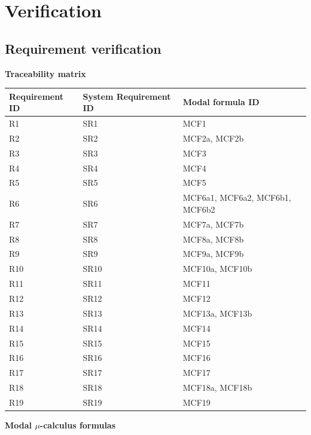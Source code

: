 \documentclass[12pt]{report}
\begin{document}
	\chapter{Verification}

    \section{Requirement verification}

    \textbf{Traceability matrix}\\
    \begin{tabular}{| l | l | l | }
        \hline
        Requirement ID & System Requirement ID & Modal formula ID \\ \hline
        R1 & SR1 & MCF1 \\ \hline
        R2 & SR2 & MCF2a, MCF2b \\ \hline
        R3 & SR3 & MCF3 \\ \hline
        R4 & SR4 & MCF4 \\ \hline
        R5 & SR5 & MCF5 \\ \hline
        R6 & SR6 & MCF6a1, MCF6a2, MCF6b1, MCF6b2 \\ \hline
        R7 & SR7 & MCF7a, MCF7b \\ \hline
        R8 & SR8 & MCF8a, MCF8b \\ \hline
        R9 & SR9 & MCF9a, MCF9b \\ \hline
        R10 & SR10 & MCF10a, MCF10b \\ \hline
        R11 & SR11 & MCF11 \\ \hline
        R12 & SR12 & MCF12 \\ \hline
        R13 & SR13 & MCF13a, MCF13b \\ \hline
        R14 & SR14 & MCF14 \\ \hline
        R15 & SR15 & MCF15 \\ \hline
        R16 & SR16 & MCF16 \\ \hline
        R17 & SR17 & MCF17 \\ \hline
        R18 & SR18 & MCF18a, MCF18b \\ \hline
        R19 & SR19 & MCF19 \\  \hline
    \end{tabular}

    \pagebreak


    \textbf{Modal $\mu$-calculus formulas}\\
\end{document}

